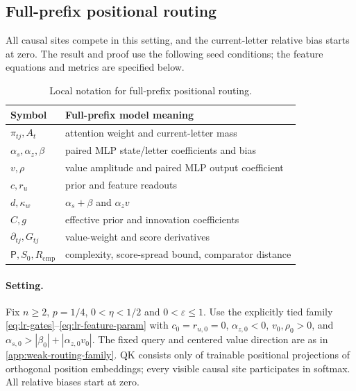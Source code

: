 \subsection{Full-prefix positional routing}
\label{app:weak-seeded-full-prefix-routing}

All causal sites compete in this setting, and the current-letter relative bias
starts at zero. The result and proof use the following seed conditions; the
feature equations and metrics are specified below.

\begin{table}[htbp]
\centering\small
\begin{tabular}{@{}ll@{}}
\toprule
Symbol & Full-prefix model meaning\\
\midrule
$\pi_{tj},A_t$ & attention weight and current-letter mass\\
$\alpha_s,\alpha_z,\beta$ & paired MLP state/letter coefficients and bias\\
$v,\rho$ & value amplitude and paired MLP output coefficient\\
$c,r_u$ & prior and feature readouts\\
$d,\kappa_w$ & $\alpha_s+\beta$ and $\alpha_z v$\\
$C,g$ & effective prior and innovation coefficients\\
$\partial_{tj},G_{tj}$ & value-weight and score derivatives\\
$\mathsf P,S_0,R_{\mathrm{cmp}}$ & complexity, score-spread bound, comparator distance\\
\bottomrule
\end{tabular}
\caption{Local notation for full-prefix positional routing.}
\label{tab:lr-notation}
\end{table}

\paragraph{Setting.}\label{app:lr-setting}
Fix $n\ge2$, $p=1/4$, $0<\eta<1/2$ and $0<\varepsilon\le1$.
Use the explicitly tied family \eqref{eq:lr-gates}--\eqref{eq:lr-feature-param}
with $c_0=r_{u,0}=0$, $\alpha_{z,0}<0$, $v_0,\rho_0>0$, and
$\alpha_{s,0}>|\beta_0|+|\alpha_{z,0}v_0|$. The fixed query and centered value direction
are as in \cref{app:weak-routing-family}. QK consists only of trainable
positional projections of orthogonal position embeddings; every visible
causal site participates in softmax. All relative biases start at zero.

